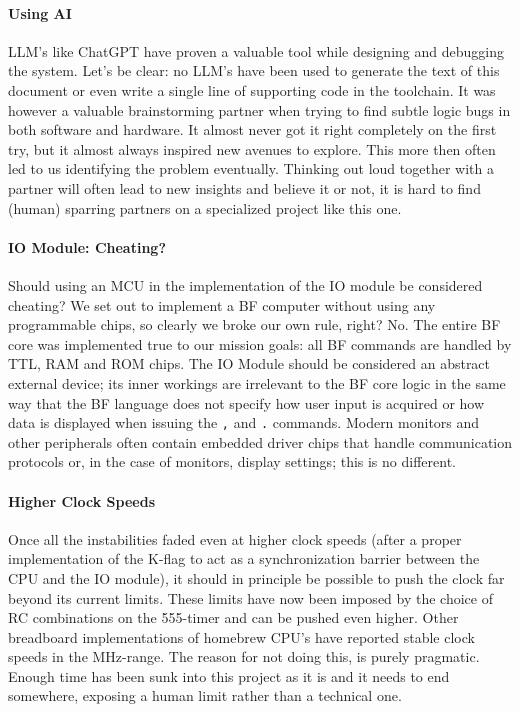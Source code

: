 \paragraph{Using AI} LLM's like ChatGPT have proven a valuable tool while designing and debugging the system. Let's be clear: no LLM's have been used to generate the text of this document or even write a single line of supporting code in the toolchain. It was however a valuable brainstorming partner when trying to find subtle logic bugs in both software and hardware. It almost never got it right completely on the first try, but it almost always inspired new avenues to explore. This more then often led to us identifying the problem eventually. Thinking out loud together with a partner will often lead to new insights and believe it or not, it is hard to find (human) sparring partners on a specialized project like this one.

\paragraph{IO Module: Cheating?} Should using an MCU in the implementation of the IO module be considered cheating? We set out to implement a BF computer without using any programmable chips, so clearly we broke our own rule, right? No. The entire BF core was implemented true to our mission goals: all BF commands are handled by TTL, RAM and ROM chips. The IO Module should be considered an abstract external device; its inner workings are irrelevant to the BF core logic in the same way that the BF language does not specify how user input is acquired or how data is displayed when issuing the \texttt{,} and \texttt{.} commands. Modern monitors and other peripherals often contain embedded driver chips that handle communication protocols or, in the case of monitors, display settings; this is no different.

\paragraph{Higher Clock Speeds} Once all the instabilities faded even at higher clock speeds (after a proper implementation of the K-flag to act as a synchronization barrier between the CPU and the IO module), it should in principle be possible to push the clock far beyond its current limits. These limits have now been imposed by the choice of RC combinations on the 555-timer and can be pushed even higher. Other breadboard implementations of homebrew CPU's have reported stable clock speeds in the MHz-range. The reason for not doing this, is purely pragmatic. Enough time has been sunk into this project as it is and it needs to end somewhere, exposing a human limit rather than a technical one.

